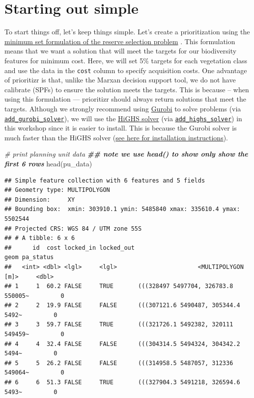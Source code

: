 \documentclass[
  12pt,
]{book}
\newenvironment{Shaded}{\begin{snugshade}}{\end{snugshade}}
\newcommand{\CommentTok}[1]{\textcolor[rgb]{0.56,0.35,0.01}{\textit{#1}}}
\newcommand{\DocumentationTok}[1]{\textcolor[rgb]{0.56,0.35,0.01}{\textbf{\textit{#1}}}}
\newcommand{\FunctionTok}[1]{\textcolor[rgb]{0.00,0.00,0.00}{#1}}
\newcommand{\NormalTok}[1]{#1}
\begin{document}
\hypertarget{starting-out-simple}{%
\section{Starting out simple}\label{starting-out-simple}}

To start things off, let's keep things simple. Let's create a prioritization using the \href{https://prioritizr.net/reference/add_min_set_objective.html}{minimum set formulation of the reserve selection problem} \citep{r15}. This formulation means that we want a solution that will meet the targets for our biodiversity features for minimum cost. Here, we will set 5\% targets for each vegetation class and use the data in the \texttt{cost} column to specify acquisition costs. One advantage of prioritizr is that, unlike the Marxan decision support tool, we do not have calibrate (SPFs) to ensure the solution meets the targets. This is because -- when using this formulation --- prioritizr should always return solutions that meet the targets. Although we strongly recommend using \href{https://www.gurobi.com/}{Gurobi} to solve problems (via \href{https://prioritizr.net/reference/add_gurobi_solver.html}{\texttt{add\_gurobi\_solver}}), we will use the \href{https://prioritizr.net/reference/add_highs_solver.html}{HiGHS solver} (via \href{https://prioritizr.net/reference/add_highs_solver.html}{\texttt{add\_highs\_solver}}) in this workshop since it is easier to install. This is because the Gurobi solver is much faster than the HiGHS solver (\href{https://prioritizr.net/articles/gurobi_installation.html}{see here for installation instructions}).

\clearpage

\begin{Shaded}
\begin{Highlighting}[]
\CommentTok{\# print planning unit data}
\DocumentationTok{\#\# note we use head() to show only show the first 6 rows}
\FunctionTok{head}\NormalTok{(pu\_data)}
\end{Highlighting}
\end{Shaded}

\begin{verbatim}
## Simple feature collection with 6 features and 5 fields
## Geometry type: MULTIPOLYGON
## Dimension:     XY
## Bounding box:  xmin: 303910.1 ymin: 5485840 xmax: 335610.4 ymax: 5502544
## Projected CRS: WGS 84 / UTM zone 55S
## # A tibble: 6 x 6
##      id  cost locked_in locked_out                                geom pa_status
##   <int> <dbl> <lgl>     <lgl>                       <MULTIPOLYGON [m]>     <dbl>
## 1     1  60.2 FALSE     TRUE       (((328497 5497704, 326783.8 550005~         0
## 2     2  19.9 FALSE     FALSE      (((307121.6 5490487, 305344.4 5492~         0
## 3     3  59.7 FALSE     TRUE       (((321726.1 5492382, 320111 549459~         0
## 4     4  32.4 FALSE     FALSE      (((304314.5 5494324, 304342.2 5494~         0
## 5     5  26.2 FALSE     FALSE      (((314958.5 5487057, 312336 549064~         0
## 6     6  51.3 FALSE     TRUE       (((327904.3 5491218, 326594.6 5493~         0
\end{verbatim}
\end{document}
